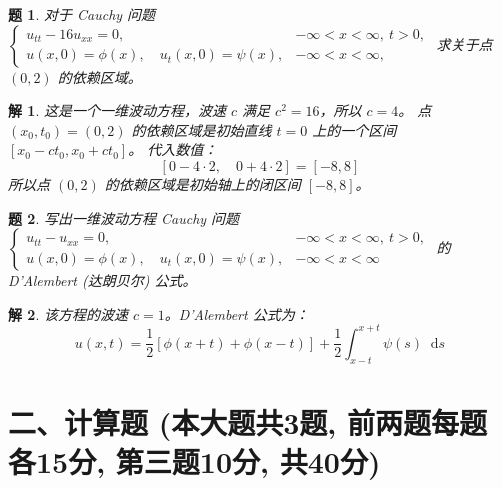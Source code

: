 \documentclass[12pt,a4paper]{article}
\newcommand{\diff}{\mathop{}\!\mathrm{d}}  %
\newtheorem{problem}{题}
\newtheorem*{solution}{解}
\begin{document}
	\begin{problem}
		对于 Cauchy 问题
		$
		\begin{cases}
			u_{tt} - 16u_{xx} = 0, & -\infty < x < \infty, \ t > 0, \\
			u(x, 0) = \phi(x), \quad u_t(x, 0) = \psi(x), & -\infty < x < \infty,
		\end{cases}
		$
		求关于点 $(0,2)$ 的依赖区域。
	\end{problem}
	\hrulefill
	\begin{solution}
		这是一个一维波动方程，波速 $c$ 满足 $c^2=16$，所以 $c=4$。
		点 $(x_0, t_0) = (0, 2)$ 的依赖区域是初始直线 $t=0$ 上的一个区间 $[x_0 - ct_0, x_0 + ct_0]$。
		代入数值：
		\[
		[0 - 4 \cdot 2, \quad 0 + 4 \cdot 2] = [-8, 8]
		\]
		所以点 $(0,2)$ 的依赖区域是初始轴上的闭区间 $[-8, 8]$。
	\end{solution}
	\hrulefill
	
	\begin{problem}
		写出一维波动方程 Cauchy 问题
		$
		\begin{cases}
			u_{tt} - u_{xx} = 0, & -\infty < x < \infty, \ t > 0, \\
			u(x, 0) = \phi(x), \quad u_t(x, 0) = \psi(x), & -\infty < x < \infty
		\end{cases}
		$
		的 D'Alembert (达朗贝尔) 公式。
	\end{problem}
	\hrulefill
	\begin{solution}
		该方程的波速 $c=1$。D'Alembert 公式为：
		\[
		u(x,t) = \frac{1}{2}[\phi(x+t) + \phi(x-t)] + \frac{1}{2}\int_{x-t}^{x+t} \psi(s) \diff s
		\]
	\end{solution}
	
	\newpage
	\section*{二、计算题 (本大题共3题, 前两题每题各15分, 第三题10分, 共40分)}
	
\end{document}
